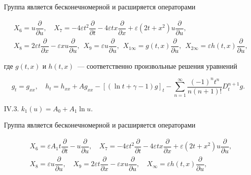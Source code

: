 \begin{theorem}
Группа является бесконечномерной и расширяется операторами

\vspace{-2mm}

\begin{eqnarray*}

& X_6=u\dfrac{\partial}{\partial u}, \quad

X_7=-4\varepsilon t^2 \dfrac{\partial}{\partial t}-4\varepsilon tx\dfrac{\partial}{\partial x}+\varepsilon (2t+x^2) u \dfrac{\partial}{\partial u}, \quad \\

& X_8=2\varepsilon t\dfrac{\partial}{\partial x}-\varepsilon x u\dfrac{\partial}{\partial u}, \ \

X_{9}=\varepsilon u\dfrac{\partial}{\partial u}, \ \

X_{1\infty}=g(t,x) \dfrac{\partial}{\partial u}, \ \

X_{2\infty}=\varepsilon h(t,x) \dfrac{\partial}{\partial u},

\end{eqnarray*}

где $g(t,x)$ и $h(t,x)$~--- соответственно произвольные решения уравнений

\vspace{-2mm}

$$

g_t=g_{xx}, \quad h_t=h_{xx}+A g_{xx}-[(\ln t+\gamma-1)g]_t-\sum_{n=1}^{\infty} \dfrac{(-1)^n t^n}{n(n+1)!}D^{n+1}_t g.

$$



$\mathrm{IV}.3.$ $k_1(u)=A_0+A_1 \ln u$.



Группа является бесконечномерной и расширяется операторами

\begin{eqnarray*}

& X_6 = \varepsilon A_1 t\dfrac{\partial}{\partial t}-u\dfrac{\partial}{\partial u}, \quad

X_7=-4\varepsilon t^2 \dfrac{\partial}{\partial t}-4\varepsilon tx\dfrac{\partial}{\partial x}+\varepsilon (2t+x^2) u \dfrac{\partial}{\partial u}, \\

& X_8=\varepsilon u\dfrac{\partial}{\partial u}, \quad

X_9=2\varepsilon t\dfrac{\partial}{\partial x}-\varepsilon x u\dfrac{\partial}{\partial u}, \quad

X_{\infty}=\varepsilon h(t,x) \dfrac{\partial}{\partial u},


\end{eqnarray*}
\end{theorem}
